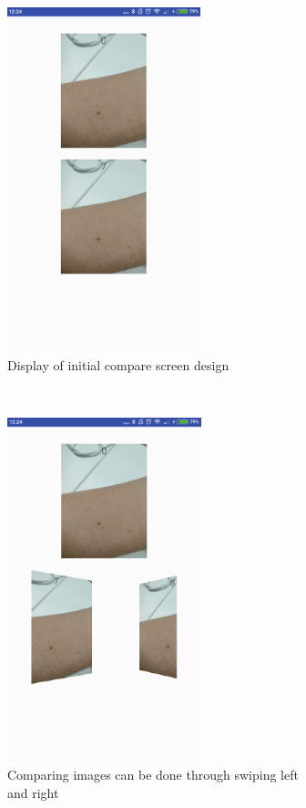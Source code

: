 \clearpage
\begin{figure}[t!]
    \centering
    \begin{subfigure}[t]{0.5\textwidth}
        \centering
        \includegraphics[height=10cm]{figures/oldcompare1.png}
        \caption{Display of initial compare screen design}
        \label{fig:oldcompare1}
    \end{subfigure}%
    ~
    \begin{subfigure}[t]{0.5\textwidth}
        \centering
        \includegraphics[height=10cm]{figures/oldcompare2.png}
        \caption{Comparing images can be done through swiping left and right}
        \label{fig:oldcompare2}
    \end{subfigure}
    \begin{subfigure}[t]{0.5\textwidth}

\end{subfigure}
\end{figure}
